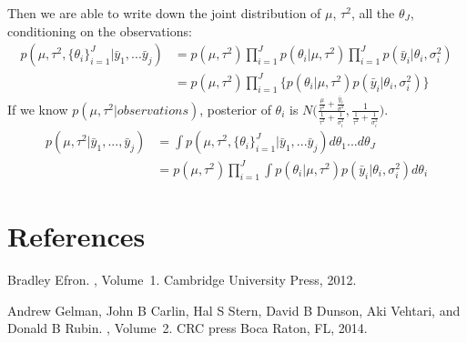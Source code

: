 \documentclass[twoside]{article}
\begin{document}
Then we are able to write down the joint distribution of $\mu$, $\tau^2$, all the $\theta_J$, conditioning on the observations:
\begin{align*}
      p(\mu, \tau^2, \big\{\theta_i \big\} ^{J}_{i=1} | \bar{y}_1, ... \bar{y}_j) & = p(\mu, \tau^2) \prod_{i=1}^{J} p(\theta_i|\mu, \tau^2) \prod_{i=1}^{J} p(\bar{y}_i|\theta_i, \sigma_i^2) \\
    & =  p(\mu, \tau^2) \prod_{i=1}^{J} \big\{ p(\theta_i|\mu, \tau^2) p(\bar{y}_i|\theta_i, \sigma_i^2) \big\}
\end{align*}
If we know $p(\mu, \tau^2 | observations)$, posterior of $\theta_i$ is $N\big( \frac{\frac{\mu}{\tau^2}+\frac{\bar{y}_i}{\sigma^2}}{\frac{1}{\tau^2}+\frac{1}{\sigma_i^2}}, \frac{1}{\frac{1}{\tau^2}+\frac{1}{\sigma_i^2}}\big)$.
\begin{align*}
      p(\mu, \tau^2 | \bar{y}_1,...,\bar{y}_j) 
      & = \int p(\mu, \tau^2, \big\{\theta_i \big\} ^{J}_{i=1} | \bar{y}_1, ... \bar{y}_j) d\theta_1...d\theta_J \\
      & = p(\mu, \tau^2) \prod_{i=1}^{J} \int p(\theta_i|\mu, \tau^2) p(\bar{y}_i | \theta_i, \sigma_i^2) d\theta_i
\end{align*}





\section*{References}

\begin{thebibliography}{}

Bradley Efron.
, Volume~1.
\newblock Cambridge University Press, 2012.


Andrew Gelman, John B Carlin, Hal S Stern, David B Dunson, Aki Vehtari, and Donald B Rubin.
, Volume~2.
\newblock CRC press Boca Raton, FL, 2014.

\end{thebibliography}
\end{document}
